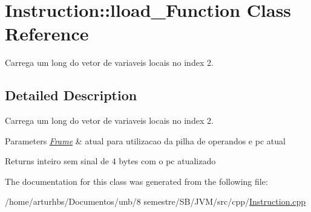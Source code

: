 \hypertarget{classInstruction_1_1lload__2Function}{}\section{Instruction\+:\+:lload\+\_\+Function Class Reference}
\label{classInstruction_1_1lload__2Function}


Carrega um long do vetor de variaveis locais no index 2.  




\subsection{Detailed Description}
Carrega um long do vetor de variaveis locais no index 2. 


\begin{DoxyParams}{Parameters}
{\em \hyperlink{classFrame}{Frame}} & atual para utilizacao da pilha de operandos e pc atual \\
\hline
\end{DoxyParams}
\begin{DoxyReturn}{Returns}
inteiro sem sinal de 4 bytes com o pc atualizado 
\end{DoxyReturn}


The documentation for this class was generated from the following file\+:\begin{DoxyCompactItemize}
\item 
/home/arturhbs/\+Documentos/unb/8 semestre/\+S\+B/\+J\+V\+M/src/cpp/\hyperlink{Instruction_8cpp}{Instruction.\+cpp}\end{DoxyCompactItemize}
